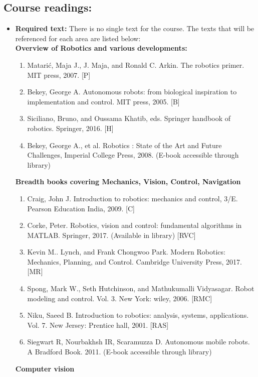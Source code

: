 \documentclass[a4paper]{article}
\begin{document}
\subsection*{Course readings:}
\begin{itemize}
\item \textbf{Required text:} There is no single text for the course. The texts that will be referenced for each area are listed below:\\

	\textbf{Overview of Robotics and various developments:}
	\begin{enumerate}[label=(\alph*)]
		\item Matarić, Maja J., J. Maja, and Ronald C. Arkin. The robotics primer. MIT press, 2007. [P]
		\item Bekey, George A. Autonomous robots: from biological inspiration to implementation and control. MIT press, 2005. [B] 
		\item Siciliano, Bruno, and Oussama Khatib, eds. Springer handbook of robotics. Springer, 2016. [H]
		\item Bekey, George A., et al. Robotics : State of the Art and Future Challenges, Imperial College Press, 2008. (E-book accessible through library)
	\end{enumerate}
	\textbf{Breadth books covering Mechanics, Vision, Control, Navigation}
	\begin{enumerate}[label=(\alph*)]
		\item Craig, John J. Introduction to robotics: mechanics and control, 3/E. Pearson Education India, 2009. [C] 
		\item Corke, Peter. Robotics, vision and control: fundamental algorithms in MATLAB. Springer, 2017. (Available in library) [RVC] 
		\item Kevin M.. Lynch, and Frank Chongwoo Park. Modern Robotics: Mechanics, Planning, and Control. Cambridge University Press, 2017. [MR] 
		\item Spong, Mark W., Seth Hutchinson, and Mathukumalli Vidyasagar. Robot modeling and control. Vol. 3. New York: wiley, 2006. [RMC]	
		\item Niku, Saeed B. Introduction to robotics: analysis, systems, applications. Vol. 7. New Jersey: Prentice hall, 2001. [RAS]			
		\item Siegwart R, Nourbakhsh IR, Scaramuzza D. Autonomous mobile robots. A Bradford Book. 2011. (E-book accessible through library)
	\end{enumerate}
	\textbf{Computer vision}
	\begin{enumerate}[label=(\alph*)]

\end{enumerate}
\end{itemize}
\end{document}

